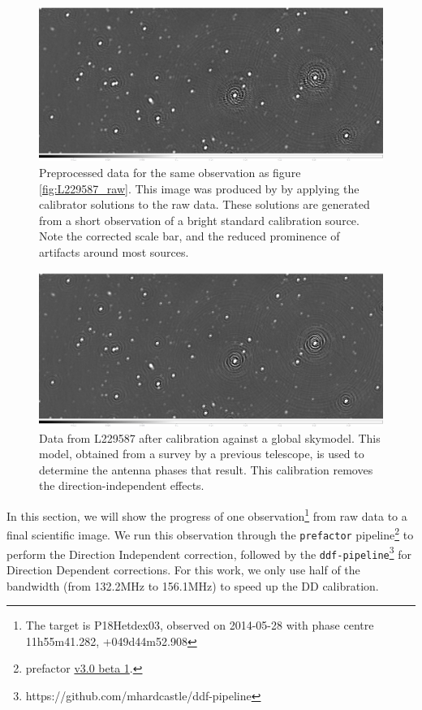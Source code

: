 \begin{figure}[!htb]
    \centering
    \includegraphics[width=.8\linewidth]{background/figures/prepcal_image_brighter.jpeg}
    \caption[Image of preprocessed data]{Preprocessed data for the same observation as figure \ref{fig:L229587_raw}. This image was produced by by applying the calibrator solutions to the raw data. These solutions are generated from a short observation of a bright standard calibration source. Note the corrected scale bar, and the reduced prominence of artifacts around most sources. }
    \label{fig:L229587_prepcal}
\end{figure}
\begin{figure}[!htb]
    \centering
    \includegraphics[width=.8\linewidth]{background/figures/final_gsmacl_brighter.jpeg}
    \caption[Image of DI calibrated data]{Data from L229587 after calibration against a global skymodel. This model, obtained from a survey by a previous telescope, is used to determine the antenna phases that result. This calibration removes the direction-independent effects. }
    \label{fig:L229587_DI_cal}
\end{figure}


In this section, we will show the progress of one observation\footnote{The target is P18Hetdex03, observed on 2014-05-28 with phase centre 11h55m41.282, +049d44m52.908} from raw data to a final scientific image. We run this observation through the \texttt{prefactor} pipeline\footnote{prefactor \href{https://github.com/lofar-astron/prefactor/releases/tag/V3.0-beta1}{v3.0 beta 1}. } to perform the Direction Independent correction, followed by the \texttt{ddf-pipeline}\footnote{https://github.com/mhardcastle/ddf-pipeline} for Direction Dependent corrections. For this work, we only use half of the bandwidth (from 132.2MHz to 156.1MHz) to speed up the DD calibration.

